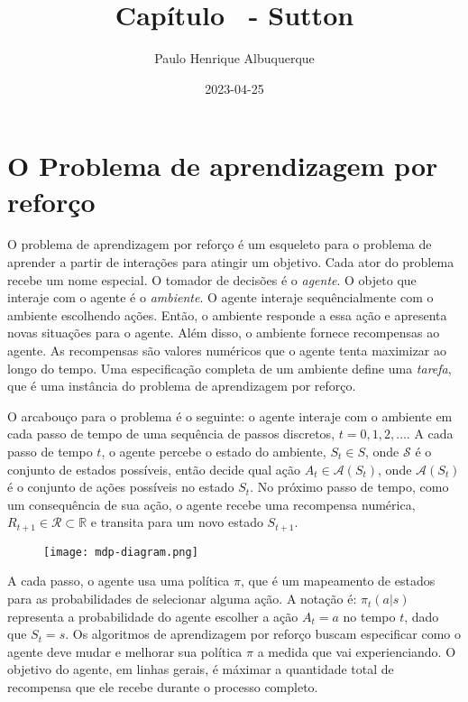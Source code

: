 \documentclass{article}
\title{Capítulo \cha\   - Sutton}
\author{Paulo Henrique Albuquerque}
\date{2023-04-25}
\begin{document}
\maketitle

\section{O Problema de aprendizagem por reforço}

O problema de aprendizagem  por reforço é um esqueleto para o problema de aprender a partir de interações para atingir um objetivo. Cada ator do problema recebe um nome especial. O tomador de decisões é o \textit{agente}. O objeto que interaje com o agente é o \textit{ambiente}. O agente interaje sequêncialmente com o ambiente escolhendo ações. Então, o ambiente responde a essa ação e apresenta novas situações para o agente. Além disso, o ambiente fornece recompensas ao agente. As recompensas são valores numéricos que o agente tenta maximizar ao longo do tempo. Uma especificação completa de um ambiente define uma \textit{tarefa}, que é uma instância do problema de aprendizagem por reforço. 

O arcabouço para o problema é o seguinte: o agente interaje com o ambiente em cada passo de tempo de uma sequência de passos discretos, $t = 0,1,2,\ldots$. A cada passo de tempo $t$, o agente percebe o estado do ambiente, $S_t\in S$, onde $\mathcal{S}$ é o conjunto de estados possíveis, então decide qual ação $A_t \in \mathcal{A}(S_t)$, onde $\mathcal{A}(S_t)$ é o conjunto de ações possíveis no estado $S_t$. No próximo passo de tempo, como um consequência de sua ação, o agente recebe uma recompensa numérica, $R_{t+1}\in \mathcal{R} \subset \mathbb{R}$ e transita para um novo estado $S_{t+1}$.

\begin{figure}[htpb]
  \centering
  \texttt{[image: mdp-diagram.png]}
  \caption{}
  \label{fig:mdp}
\end{figure}  

A cada passo, o agente usa uma política $\pi$, que é um mapeamento de estados para as probabilidades de selecionar alguma ação. A notação é: $\pi_t(a|s)$ representa a probabilidade do agente escolher a ação $A_t=a$ no tempo $t$, dado que $S_t=s$. Os algoritmos de aprendizagem por reforço buscam especificar como o agente deve mudar e melhorar sua política $\pi$ a medida que vai experienciando. O objetivo do agente, em linhas gerais, é máximar a quantidade total de recompensa que ele recebe durante o processo completo.
\end{document}
